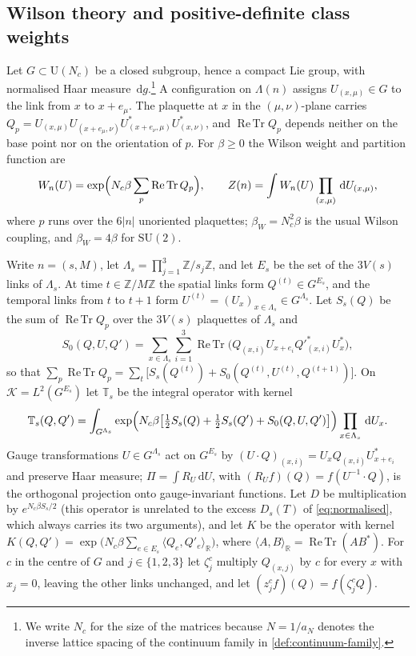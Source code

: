 \documentclass[11pt,a4paper]{amsart}
\theoremstyle{definition}
\theoremstyle{remark}
\numberwithin{equation}{section}
\DeclareMathOperator{\ReTr}{Re\,Tr}  %
\newcommand{\R}{\mathbb{R}}          %
\newcommand{\Z}{\mathbb{Z}}          %
\newcommand{\Kspace}{\mathcal{K}}    %
\newcommand{\ip}[2]{\langle #1,#2\rangle}  %
\newcommand{\dd}{\,\mathrm{d}}             %
\newcommand{\SU}{\mathrm{SU}}              %
\newcommand{\U}{\mathrm{U}}                %
\newcommand{\TT}{\mathbb{T}}               %
\newcommand{\Zc}{\mathcal{Z}}              %
\newcommand{\Dexc}[2]{D_{#1}(#2)}          %
\newcommand{\Vol}[1]{V(#1)}                %
\newcommand{\aN}{a_N}                      %
\newcommand{\betaW}{\beta_{W}}             %
\begin{document}
\subsection{Wilson theory and positive-definite class weights}

Let $G\subset\U(N_c)$ be a closed subgroup, hence a compact Lie group, with normalised Haar measure $\dd g$.\footnote{We write $N_c$ for the size of the matrices because $N=1/\aN$ denotes the inverse lattice spacing of the continuum family in \cref{def:continuum-family}.} A configuration on $\Lambda(n)$ assigns $U_{(x,\mu)}\in G$ to the link from $x$ to $x+e_\mu$. The plaquette at $x$ in the $(\mu,\nu)$-plane carries $Q_p=U_{(x,\mu)}U_{(x+e_\mu,\nu)}U_{(x+e_\nu,\mu)}^*U_{(x,\nu)}^*$, and $\ReTr Q_p$ depends neither on the base point nor on the orientation of $p$. For $\beta\ge0$ the Wilson weight \cite{wilson1974} and partition function are
\begin{equation}\label{eq:wilson-weight}
W_n(U)=\exp\Bigl(N_c\beta\sum_p\ReTr Q_p\Bigr),\qquad Z(n)=\int W_n(U)\prod_{(x,\mu)}\dd U_{(x,\mu)},
\end{equation}
where $p$ runs over the $6|n|$ unoriented plaquettes; $\betaW=N_c^2\beta$ is the usual Wilson coupling, and $\betaW=4\beta$ for $\SU(2)$.

Write $n=(s,M)$, let $\Lambda_s=\prod_{j=1}^3\Z/s_j\Z$, and let $E_s$ be the set of the $3\Vol{s}$ links of $\Lambda_s$. At time $t\in\Z/M\Z$ the spatial links form $Q^{(t)}\in G^{E_s}$, and the temporal links from $t$ to $t+1$ form $U^{(t)}=(U_x)_{x\in\Lambda_s}\in G^{\Lambda_s}$. Let $S_s(Q)$ be the sum of $\ReTr Q_p$ over the $3\Vol{s}$ plaquettes of $\Lambda_s$ and
\[
S_0(Q,U,Q')=\sum_{x\in\Lambda_s}\sum_{i=1}^3\ReTr\bigl(Q_{(x,i)}U_{x+e_i}Q'^{*}_{(x,i)}U_x^*\bigr),
\]
so that $\sum_p\ReTr Q_p=\sum_t\bigl[S_s(Q^{(t)})+S_0(Q^{(t)},U^{(t)},Q^{(t+1)})\bigr]$. On $\Kspace=L^2(G^{E_s})$ let $\TT_s$ be the integral operator with kernel
\begin{equation}\label{eq:transfer-kernel}
\TT_s(Q,Q')=\int_{G^{\Lambda_s}}\exp\Bigl(N_c\beta\bigl[\tfrac12S_s(Q)+\tfrac12S_s(Q')+S_0(Q,U,Q')\bigr]\Bigr)\prod_{x\in\Lambda_s}\dd U_x .
\end{equation}
Gauge transformations $U\in G^{\Lambda_s}$ act on $G^{E_s}$ by $(U\cdot Q)_{(x,i)}=U_xQ_{(x,i)}U_{x+e_i}^*$ and preserve Haar measure; $\Pi=\int R_U\dd U$, with $(R_Uf)(Q)=f(U^{-1}\cdot Q)$, is the orthogonal projection onto gauge-invariant functions. Let $D$ be multiplication by $e^{N_c\beta S_s/2}$ (this operator is unrelated to the excess $\Dexc{s}{T}$ of \eqref{eq:normalised}, which always carries its two arguments), and let $K$ be the operator with kernel $K(Q,Q')=\exp\bigl(N_c\beta\sum_{e\in E_s}\ip{Q_e}{Q'_e}_{\R}\bigr)$, where $\ip{A}{B}_{\R}=\ReTr(AB^*)$. For $c$ in the centre of $G$ and $j\in\{1,2,3\}$ let $\zeta_j^c$ multiply $Q_{(x,j)}$ by $c$ for every $x$ with $x_j=0$, leaving the other links unchanged, and let $(z_j^cf)(Q)=f(\zeta_j^cQ)$.
\end{document}
